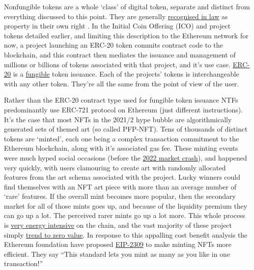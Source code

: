 Nonfungible tokens are a whole `class' of digital token, separate and distinct from everything discussed to this point. They are generally \href{https://www.signaturelitigation.com/nfts-recognised-as-property-lavinia-deborah-osbourne-v-1-persons-unknown-2-ozone-networks-inc-trading-as-opensea/}{recognised in law} as property in their own right \cite{moringiello2021property, fairfield2021tokenized}. In the Initial Coin Offering (ICO) and project tokens detailed earlier, and limiting this description to the Ethereum network for now, a project launching an ERC-20 token commits contract code to the blockchain, and this contract then mediates the issuance and management of millions or billions of tokens associated with that project, and it's use case. \href{https://ethereum.org/en/developers/docs/standards/tokens/erc-20/}{ERC-20} is a \href{https://en.wikipedia.org/wiki/Fungibility}{fungible} token issuance. Each of the projects' tokens is interchangeable with any other token. They're all the same from the point of view of the user.\par
Rather than the ERC-20 contract type used for fungible token issuance NTFs predominantly use ERC-721 protocol on Ethereum (just different instructions). It's the case that most NFTs in the 2021/2 hype bubble are algorithmically generated sets of themed art (so called PFP-NFT). Tens of thousands of distinct tokens are `minted', each one being a complex transaction commitment to the Ethereum blockchain, along with it's associated gas fee. These minting events were much hyped social occasions (before the \href{https://www.theguardian.com/technology/2022/jul/02/nft-sales-hit-12-month-low-after-cryptocurrency-crash?}{2022 market crash}), and happened very quickly, with users clamouring to create art with randomly allocated features from the art schema associated with the project. Lucky winners could find themselves with an NFT art piece with more than an average number of `rare' features. If the overall mint becomes more popular, then the secondary market for all of those mints goes up, and because of the liquidity premium they can go up a lot. The perceived rarer mints go up a lot more. This whole process is \href{https://memoakten.medium.com/the-unreasonable-ecological-cost-of-cryptoart-2221d3eb2053}{very energy intensive} on the chain, and the vast majority of these project simply \href{https://www.turing.ac.uk/blog/non-fungible-tokens-can-we-predict-price-theyll-sell}{trend to zero value}. In response to this appalling cost benefit analysis the Ethereum foundation have proposed \href{https://eips.ethereum.org/EIPS/eip-2309}{EIP-2309} to make minting NFTs more efficient. They say ``This standard lets you mint as many as you like in one transaction!''\par
